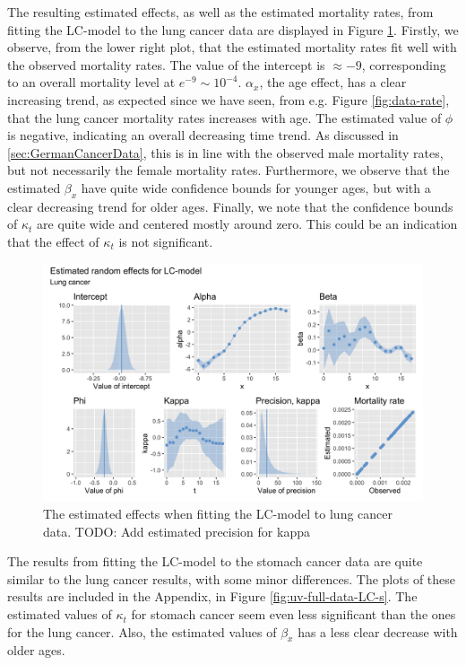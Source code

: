 \newpar The resulting estimated effects, as well as the estimated mortality rates, from fitting the LC-model to the lung cancer data are displayed in Figure \ref{fig:uv-full-data-LC-l}. Firstly, we observe, from the lower right plot, that the estimated mortality rates fit well with the observed mortality rates. The value of the intercept is $\approx -9$, corresponding to an overall mortality level at $e^{-9} \sim 10^{-4}$. $\alpha_x$, the age effect, has a clear increasing trend, as expected since we have seen, from e.g. Figure \ref{fig:data-rate}, that the lung cancer mortality rates increases with age. The estimated value of $\phi$ is negative, indicating an overall decreasing time trend. As discussed in \ref{sec:GermanCancerData}, this is in line with the observed male mortality rates, but not necessarily the female mortality rates. Furthermore, we observe that the estimated $\beta_x$ have quite wide confidence bounds for younger ages, but with a clear decreasing trend for older ages. Finally, we note that the confidence bounds of $\kappa_t$ are quite wide and centered mostly around zero. This could be an indication that the effect of $\kappa_t$ is not significant. 

\begin{figure}[h!]
    \centering
    \includegraphics[width=0.85\linewidth]{real-data/real-data-univariate/Figures/uv-full-data-lc-l.png}
    \caption{The estimated effects when fitting the LC-model to lung cancer data. \textcolor{myDarkBlue}{TODO: Add estimated precision for kappa}}
    \label{fig:uv-full-data-LC-l}
\end{figure}

\newpar The results from fitting the LC-model to the stomach cancer data are quite similar to the lung cancer results, with some minor differences. The plots of these results are included in the Appendix, in Figure \ref{fig:uv-full-data-LC-s}. The estimated values of $\kappa_t$ for stomach cancer seem even less significant than the ones for the lung cancer. Also, the estimated values of $\beta_x$ has a less clear decrease with older ages. 

